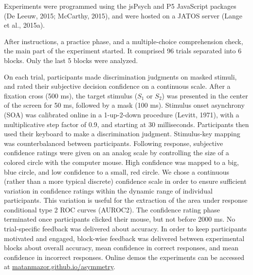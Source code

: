 \documentclass[12pt,twoside]{reedthesis}
\begin{document}
Experiments were programmed using the jsPsych and P5 JavaScript packages (De Leeuw, 2015; McCarthy, 2015), and were hosted on a JATOS server (Lange et al., 2015a).

After instructions, a practice phase, and a multiple-choice comprehension check, the main part of the experiment started. It comprised 96 trials separated into 6 blocks. Only the last 5 blocks were analyzed.

On each trial, participants made discrimination judgments on masked stimuli, and rated their subjective decision confidence on a continuous scale. After a fixation cross (500 ms), the target stimulus (\(S_1\) or \(S_2\)) was presented in the center of the screen for 50 ms, followed by a mask (100 ms). Stimulus onset asynchrony (SOA) was calibrated online in a 1-up-2-down procedure (Levitt, 1971), with a multiplicative step factor of 0.9, and starting at 30 milliseconds. Participants then used their keyboard to make a discrimination judgment. Stimulus-key mapping was counterbalanced between participants. Following response, subjective confidence ratings were given on an analog scale by controlling the size of a colored circle with the computer mouse. High confidence was mapped to a big, blue circle, and low confidence to a small, red circle. We chose a continuous (rather than a more typical discrete) confidence scale in order to ensure sufficient variation in confidence ratings within the dynamic range of individual participants. This variation is useful for the extraction of the area under response conditional type 2 ROC curves (AUROC2). The confidence rating phase terminated once participants clicked their mouse, but not before 2000 ms. No trial-specific feedback was delivered about accuracy. In order to keep participants motivated and engaged, block-wise feedback was delivered between experimental blocks about overall accuracy, mean confidence in correct responses, and mean confidence in incorrect responses. Online demos the experiments can be accessed at \url{matanmazor.github.io/asymmetry}.
\end{document}
